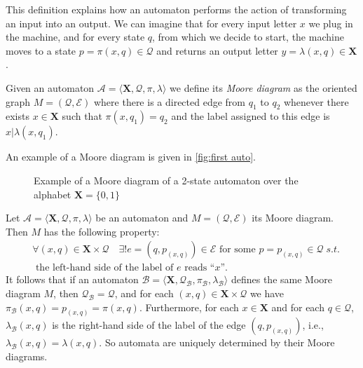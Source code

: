 \documentclass[mat1]{fmfdeloTS2.0}
\newcommand{\obs}{}				%
\newcommand{\mtxt}{\textrm}				%
\newcommand{\abece}{\mathbf{X}}			%
\newcommand{\auto}{\mathcal}			%
\newcommand{\QQ}{\mathcal{Q}}			%
\begin{document}
This definition explains how an automaton performs the action of transforming an input into an output. %
We can imagine that for every \obs{input letter} $x$ we plug in the machine, and for every \obs{state} $q$, from which we decide to start, the machine moves to a state $p=\pi(x,q)\in\QQ$ and returns an \obs{output letter} $y=\lambda(x,q)\in\abece$.

\begin{definition}
Given an automaton $\auto{A}=\langle\abece,\QQ,\pi,\lambda\rangle$ we define its \emph{Moore diagram} as the oriented graph $M=(\QQ, \mathcal{E})$ where there is a directed edge from $q_1$ to $q_2$ whenever there exists $x\in \abece$ such that $\pi(x,q_1)=q_2$ and the label assigned to this edge is $x|\lambda(x,q_1)$.
\end{definition}\label{def:moore diagram}

An example of a Moore diagram is given in \autoref{fig:first auto}.
\begin{figure}[h!]
\caption{Example of a Moore diagram of a 2-state automaton over the alphabet $\abece=\{0,1\}$}
\label{fig:first auto}
\end{figure}

\begin{remark}
Let $\auto{A}=\langle \abece,\QQ,\pi,\lambda\rangle$ be an automaton and $M=(\QQ, \mathcal{E})$ its Moore diagram. Then $M$ has the following property:
\begin{equation}
\begin{split}
&\forall (x,q)\in \abece\times\QQ \quad\exists! e=(q,p_{(x,q)})\in\mathcal{E} \mtxt{ for some }p=p_{(x,q)}\in\QQ\;s.t.\\
&\mtxt{ the left-hand side of the label of }e\mtxt{ reads ``}x\mtxt{''}.
\end{split}
\label{condition every automaton}
\end{equation}
It follows that if an automaton $\auto{B}=\langle \abece,\QQ_{\auto{B}},\pi_{\auto{B}},\lambda_{\auto{B}}\rangle$ defines the same Moore diagram $M$, then $\QQ_\auto{B}=\QQ$, and for each $(x,q)\in\abece\times\QQ$ we have $\pi_\auto{B}(x,q)=p_{(x,q)}=\pi(x,q)$. Furthermore, for each $x\in\abece$ and for each $q\in\QQ$, $\lambda_\auto{B}(x,q)$ is the right-hand side of the label of the edge $(q,p_{(x,q)})$, i.e., $\lambda_\auto{B}(x,q)=\lambda(x,q)$. So automata are uniquely determined by their Moore diagrams. 
\end{remark}
\end{document}
